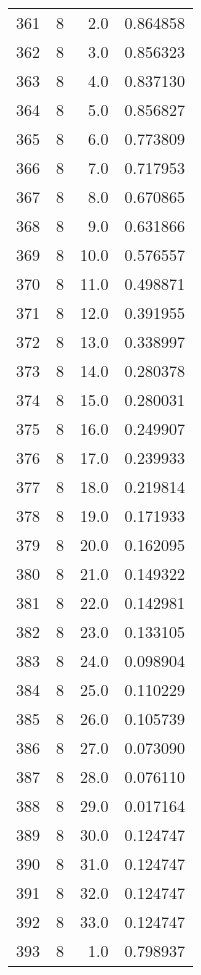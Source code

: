 \begin{tabular}{lrrr}
361 &        8 &      2.0 &  0.864858 \\
362 &        8 &      3.0 &  0.856323 \\
363 &        8 &      4.0 &  0.837130 \\
364 &        8 &      5.0 &  0.856827 \\
365 &        8 &      6.0 &  0.773809 \\
366 &        8 &      7.0 &  0.717953 \\
367 &        8 &      8.0 &  0.670865 \\
368 &        8 &      9.0 &  0.631866 \\
369 &        8 &     10.0 &  0.576557 \\
370 &        8 &     11.0 &  0.498871 \\
371 &        8 &     12.0 &  0.391955 \\
372 &        8 &     13.0 &  0.338997 \\
373 &        8 &     14.0 &  0.280378 \\
374 &        8 &     15.0 &  0.280031 \\
375 &        8 &     16.0 &  0.249907 \\
376 &        8 &     17.0 &  0.239933 \\
377 &        8 &     18.0 &  0.219814 \\
378 &        8 &     19.0 &  0.171933 \\
379 &        8 &     20.0 &  0.162095 \\
380 &        8 &     21.0 &  0.149322 \\
381 &        8 &     22.0 &  0.142981 \\
382 &        8 &     23.0 &  0.133105 \\
383 &        8 &     24.0 &  0.098904 \\
384 &        8 &     25.0 &  0.110229 \\
385 &        8 &     26.0 &  0.105739 \\
386 &        8 &     27.0 &  0.073090 \\
387 &        8 &     28.0 &  0.076110 \\
388 &        8 &     29.0 &  0.017164 \\
389 &        8 &     30.0 &  0.124747 \\
390 &        8 &     31.0 &  0.124747 \\
391 &        8 &     32.0 &  0.124747 \\
392 &        8 &     33.0 &  0.124747 \\
393 &        8 &      1.0 &  0.798937 \\

\end{tabular}
